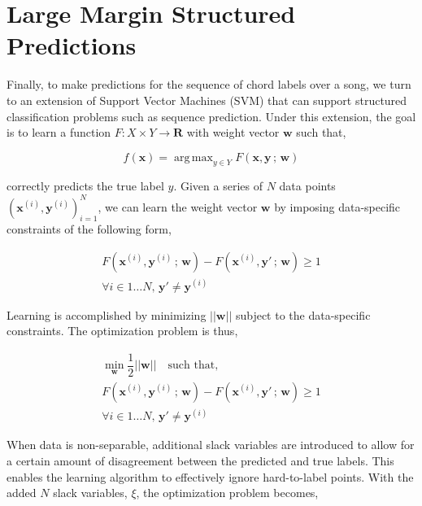 \documentclass{article}
\DeclareMathOperator*{\argmax}{arg\,max}
\begin{document}
\section{Large Margin Structured Predictions}
\label{sec:svms}

Finally, to make predictions for the sequence of chord labels over a song,
we turn to an extension of Support Vector Machines (SVM) that can support
structured classification problems such as sequence prediction. Under this
extension, the goal is to learn a function $F : X \times Y \rightarrow
\mathbf{R}$ with weight vector $\mathbf{w}$ such that,

\begin{equation*}
f(\mathbf{x}) = \argmax_{y \in Y}F(\mathbf{x},\mathbf{y}\,;\,\mathbf{w})
\end{equation*}

correctly predicts the true label $y$. Given a series of $N$ data points
$(\mathbf{x}^{(i)}, \mathbf{y}^{(i)})_{i=1}^{N}$, we can learn the weight
vector $\mathbf{w}$ by imposing data-specific constraints of the following
form,

\begin{equation*}
\begin{split}
F(\mathbf{x}^{(i)}, \mathbf{y}^{(i)}\,;\,\mathbf{w}) -
F(\mathbf{x}^{(i)}, \mathbf{y}'\,;\,\mathbf{w}) \geq 1 \\
\forall i \in 1\dots N,\,\mathbf{y}' \neq \mathbf{y}^{(i)}
\end{split}
\end{equation*}

Learning is accomplished by minimizing $||\mathbf{w}||$ subject to the
data-specific constraints. The optimization problem is thus,

\[
\begin{split}
\min_{\mathbf{w}}\dfrac{1}{2}||\mathbf{w}||\quad\text{such that,} \\
F(\mathbf{x}^{(i)}, \mathbf{y}^{(i)}\,;\,\mathbf{w}) -
F(\mathbf{x}^{(i)}, \mathbf{y}'\,;\,\mathbf{w}) \geq 1 \\
\forall i \in 1\dots N, \,\mathbf{y}' \neq \mathbf{y}^{(i)}
\end{split}
\]

When data is non-separable, additional slack variables are introduced to allow
for a certain amount of disagreement between the predicted and true labels.
  This enables the learning algorithm to effectively ignore hard-to-label
  points. With the added $N$ slack variables, $\xi$, the optimization problem
  becomes,
\end{document}
